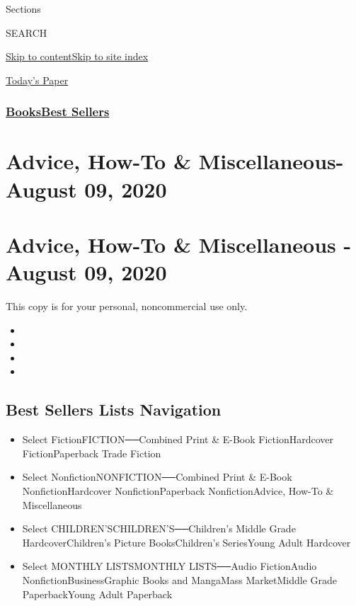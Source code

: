 Sections

SEARCH

\protect\hyperlink{site-content}{Skip to
content}\protect\hyperlink{site-index}{Skip to site index}

\href{https://myaccount.nytimes3xbfgragh.onion/auth/login?response_type=cookie\&client_id=vi}{}

\href{https://www.nytimes3xbfgragh.onion/section/todayspaper}{Today's
Paper}

\hypertarget{booksbest-sellers}{%
\subsubsection{\texorpdfstring{\href{/section/books/}{Books}\textbar{}\href{/books/best-sellers/}{Best
Sellers}}{Books\textbar{}Best Sellers}}\label{booksbest-sellers}}

\hypertarget{advice-how-to--miscellaneous--august-09-2020}{%
\section{Advice, How-To \& Miscellaneous- August 09,
2020}\label{advice-how-to--miscellaneous--august-09-2020}}

\hypertarget{advice-how-to--miscellaneous---august-09-2020}{%
\section{Advice, How-To \& Miscellaneous - August 09,
2020}\label{advice-how-to--miscellaneous---august-09-2020}}

This copy is for your personal, noncommercial use only.

\begin{itemize}
\item
\item
\item
\item
\end{itemize}

\hypertarget{best-sellers-lists-navigation}{%
\subsection{Best Sellers Lists
Navigation}\label{best-sellers-lists-navigation}}

\begin{itemize}
\tightlist
\item
  Select FictionFICTION──Combined Print \& E-Book FictionHardcover
  FictionPaperback Trade Fiction
\item
  Select NonfictionNONFICTION──Combined Print \& E-Book
  NonfictionHardcover NonfictionPaperback NonfictionAdvice, How-To \&
  Miscellaneous
\item
  Select CHILDREN'SCHILDREN'S──Children's Middle Grade
  HardcoverChildren's Picture BooksChildren's SeriesYoung Adult
  Hardcover
\item
  Select MONTHLY LISTSMONTHLY LISTS──Audio FictionAudio
  NonfictionBusinessGraphic Books and MangaMass MarketMiddle Grade
  PaperbackYoung Adult Paperback
\end{itemize}

